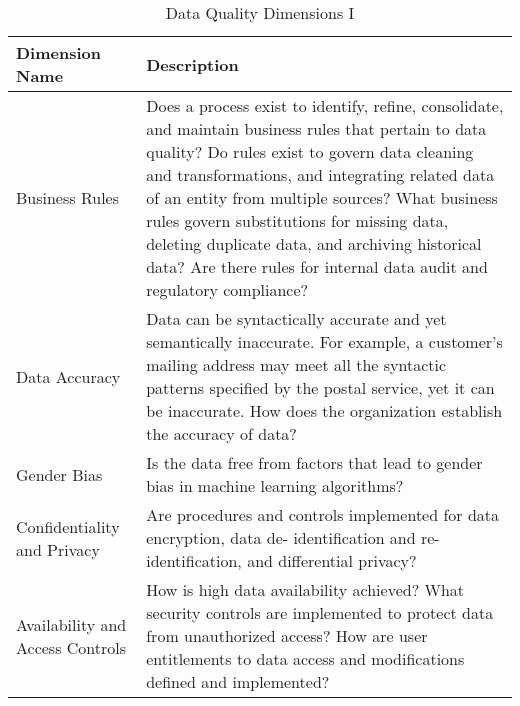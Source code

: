 \begin{table}
\vspace*{-3.5in}
\caption{Data Quality Dimensions I}
\centering
\begin{tabular}{p{4.0cm} p{11cm}}
\toprule
Dimension Name & Description \\ 
\bottomrule
Business Rules & 
Does a process exist to identify, refine, consolidate, and maintain business
rules that pertain to data quality? Do rules exist to govern data cleaning and
transformations, and integrating related data of an entity from multiple sources?
What business rules govern substitutions for missing data, deleting duplicate data,
and archiving historical data? Are there rules for internal data audit and regulatory
compliance? \\
Data Accuracy & 
Data can be syntactically accurate and yet semantically inaccurate. For example,
a customer's mailing address may meet all the syntactic patterns specified by the
postal service, yet it can be inaccurate. How does the organization establish the
accuracy of data? \\
Gender Bias & 
Is the data free from factors that lead to gender bias in machine learning
algorithms? \\
Confidentiality and Privacy & 
Are procedures and controls implemented for data encryption, data de-
identification and re-identification, and differential privacy? \\
Availability and Access Controls & 
How is high data availability achieved? What security controls are implemented to
protect data from unauthorized access? How are user entitlements to data access
and modifications defined and implemented? \\
\bottomrule
\end{tabular}
\end{table}